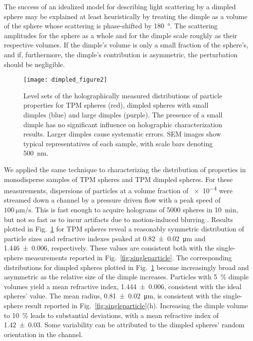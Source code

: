 The success of an idealized model for describing light scattering by a
dimpled sphere may be explained at least heuristically by treating
the dimple as a volume of the sphere whose scattering is phase-shifted
by \SI{180}{\degree}.
The scattering amplitudes for the sphere as a whole and for the dimple
scale roughly as their respective volumes.
If the dimple's volume is only a small fraction of the
sphere's, and if, furthermore, the dimple's contribution is asymmetric,
the perturbation should be negligible.

\begin{figure}[!t]
  \centering
  \texttt{[image: dimpled\_figure2]}
  \caption{Level sets of the holographically measured 
    distributions of particle properties for TPM spheres
    (red), dimpled spheres with small dimples (blue) and
    large dimples (purple).  The presence of a small dimple
    has no significant influence on holographic characterization
    results.  Larger dimples cause systematic errors.
    SEM images show typical representatives of each sample,
    with scale bars denoting \SI{500}{\nm}.}
  \label{fig:distributions}
\end{figure}

We applied the same technique to characterizing the distribution
of properties in monodisperse samples of TPM spheres and 
TPM dimpled spheres.
For these measurements, dispersions of particles at a volume fraction
of \num{e-4} were streamed down a channel by a pressure driven flow
with a peak speed of $\SI{100}{\um\per\second}$.  This is fast enough
to acquire holograms of \num{5000} spheres in \SI{10}{\minute}, but
not so fast as to incur artifacts due to motion-induced blurring
\cite{cheong09,dixon11}.
Results plotted in Fig.~\ref{fig:distributions} for TPM spheres reveal
a reasonably symmetric distribution of particle sizes and refractive
indexes peaked at \SI{0.82(2)}{\um} and \num{1.446(6)}, respectively.
These values are consistent both with the single-sphere measurements
reported in Fig.~\ref{fig:singleparticle}.
The corresponding distributions for dimpled spheres plotted in
Fig.~\ref{fig:distributions} become increasingly broad and asymmetric
as the relative size of the dimple increases.
Particles with \SI{5}{\percent} dimple volumes yield a mean refractive
index, \num{1.444(6)}, consistent with the ideal spheres' value.
The mean radius, \SI{0.81(2)}{\um}, is consistent with the
  single-sphere result reported in Fig.~\ref{fig:singleparticle}(h).
Increasing the dimple volume to \SI{10}{\percent} leads to
substantial deviations, with a mean refractive index of
\num{1.42(3)}.
Some variability can be attributed to the dimpled spheres'
random orientation in the channel.

